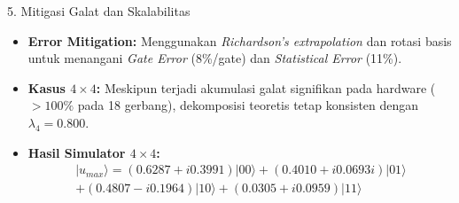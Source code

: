 \begin{frame}{5. Mitigasi Galat dan Skalabilitas}
    \begin{itemize}
        \item \textbf{Error Mitigation:} Menggunakan \textit{Richardson's extrapolation} dan rotasi basis untuk menangani \textit{Gate Error} (8\%/gate) dan \textit{Statistical Error} (11\%).
        \item \textbf{Kasus $4 \times 4$:} Meskipun terjadi akumulasi galat signifikan pada hardware ($>100\%$ pada 18 gerbang), dekomposisi teoretis tetap konsisten dengan $\lambda_4 = 0.800$.
        \item \textbf{Hasil Simulator $4 \times 4$:}
        \begin{multline}
            |u_{max}\rangle = (0.6287 + i0.3991)|00\rangle + (0.4010 + i0.0693i)|01\rangle \\
            + (0.4807 - i0.1964)|10\rangle + (0.0305 + i0.0959)|11\rangle
        \end{multline}
    \end{itemize}
\end{frame}
